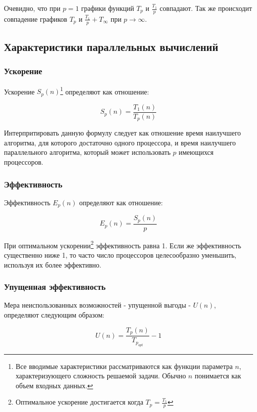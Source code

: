 \documentclass{article}
\begin{document}
			Очевидно, что при $p = 1$ графики функций $T_p$ и $\frac{T_1}{p}$ совпадают. Так же происходит совпадение графиков 				$T_p$ и $\frac{T_1}{p}+T_\infty$ при $p\to\infty$.
		\newpage
		\subsection{Характеристики параллельных вычислений}
			\subsubsection{Ускорение}
				Ускорение $S_p(n)$\footnote{Все вводимые характеристики рассматриваются как функции параметра $n$, 								характеризующего сложность решаемой задачи. Обычно $n$ понимается как объем входных данных.} определяют как 						отношение:
				
			\begin{equation}
				\label{eq:acceleration}
				S_p(n) = \frac{T_1(n)}{T_p(n)}
			\end{equation}			
				
				Интерпритировать данную формулу следует как отношение время наилучшего алгоритма, для которого достаточно одного 				процессора, и время наилучшего параллельного алгоритма, который может использовать $p$ имеющихся процессоров.				
				
			\subsubsection{Эффективность}
				Эффективность $E_p(n)$ определяют как отношение:
				
			\begin{equation}
				\label{eq:efficiency}
				E_p(n) = \frac{S_p(n)}{p}
			\end{equation}	

				При оптимальном ускорении\footnote{Оптимальное ускорение достигается когда $T_p = \frac{T_1}{p}$} эффективность 				равна 1. Если же эффективность существенно ниже 1, то часто число процессоров целесообразно уменьшить, используя 					их более эффективно. 
				
			\subsubsection{Упущенная эффективность}
				Мера неиспользованных возможностей - упущенной выгоды - $U(n)$, определяют следующим образом:
			
			\begin{equation}
				\label{eq:loss_of_efficiency}
				U(n) = \frac{T_p(n)}{T_{p_{opt}}} - 1
			\end{equation}
			
\end{document}
